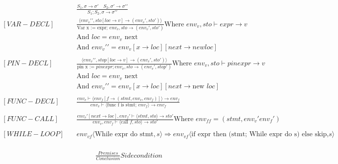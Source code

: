 \begin{align*}
    [COMPOSITION] \quad  &
    \frac
    {S_1, \sigma \rightarrow \sigma \prime \quad S_2, \sigma \prime \rightarrow \sigma \prime \prime}
    {S_1;S_2, \sigma \rightarrow \sigma \prime \prime}
    \\
    [VAR-DECL]     \quad &
    \frac
    {\langle env_v\prime \prime, sto[loc \to v] \to (env_v\prime, sto\prime)\rangle}
    {\text{Var x := expr; }env_v,sto \to (env_v\prime, sto\prime)}
    \text{Where } env_v, sto \vdash expr \to v                                                \\
                         & \text{And } loc = env_v \text{ next}                               \\
                         & \text{And } env_v\prime \prime = env_v[x\to loc][next \to new loc]
    \\
    \\
    [PIN-DECL] \quad     &
    \frac
    {\langle env_v\prime \prime, stop[loc\to v]\to (env_v\prime, sto\prime) \rangle}
    {\text{pin x := }pinexpr; env_v, sto \to (env_v\prime, stop\prime)}
    \text{Where } env_v,sto\vdash pinexpr \to v                                               \\
                         & \text{And }loc = env_v \text{ next}   \\
                         & \text{And }env_v\prime \prime = env_v[x\to loc][next\to \text{new }loc]
    \\
    \\
    [FUNC-DECL] \quad &
    \frac
    {env_v\vdash\langle env_f[f \to (stmt, env_v, env_f)]\rangle \to env_f}
    {env_v \vdash \langle \text{func f is stmt; } env_f \rangle \to env_f}
    \\
    \\
    [FUNC-CALL] \quad &
    \frac
    {env_v\prime [next \to loc], env_f\prime \vdash \langle stmt, sto \rangle \to sto\prime}
    {env_v, env_f \vdash \langle \text{call }f, sto\rangle \to sto\prime}
    \text{Where }env_{ff} = (stmt, env_v\prime env_f\prime)
    \\
    \\
    [WHILE-LOOP] \quad &
    env_{vf} \langle \text{While expr do stmt}, s \rangle \Rightarrow env_{vf} \langle \text{if expr then (stmt; While expr do s) else skip,} s \rangle
    \\
\end{align*}


\begin{align*}
    [RULE]     \quad &
    \frac
    {Premises}
    {Conclusion}
    Side condition
\end{align*}